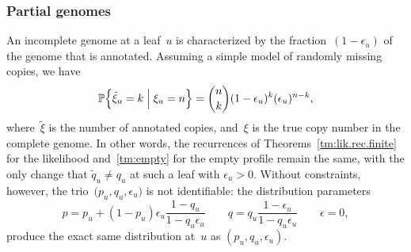 \documentclass{elsarticle}
\newcommand{\condgen}[6]{{#1}#2 #5 #3 #6 #4}
\newcommand{\PROB}{\mathbb{P}}
\newcommand{\Probcmd}[2]{\condgen{\PROB}{\Bigl\{}{\Bigm|}{\Bigr\}}{#1}{#2}}
\newcommand{\nx}{u}
\begin{document}
\subsubsection*{Partial genomes}
An incomplete genome at a leaf~$\nx$ is 
characterized by the fraction~$(1-\epsilon_{\nx})$ of the genome that is annotated. 
Assuming a simple model of randomly missing copies, we have 
\[
\Probcmd{\tilde{\xi}_{\nx}=k}{\xi_{\nx}=n} = \binom{n}{k} (1-\epsilon_{\nx})^k (\epsilon_{\nx})^{n-k},
\]
where~$\tilde{\xi}$ is the number of annotated copies, and~$\xi$ is the 
true copy number in the complete genome. In other words, the recurrences of 
Theorems~\ref{tm:lik.rec.finite} for the likelihood and~\ref{tm:empty} for the empty profile 
remain the same, with the only change that 
$\tilde{q}_{\nx}\ne q_{\nx}$ at such a leaf with $\epsilon_{\nx}>0$. 
Without constraints, however, the trio~$\bigl(p_{\nx},q_{\nx},\epsilon_{\nx}\bigr)$
is not identifiable: the distribution parameters 
\[
p = p_{\nx}+(1-p_{\nx})\epsilon_{\nx}\frac{1-q_{\nx}}{1-q_{\nx}\epsilon_{\nx}}
\qquad
q = q_{\nx}\frac{1-\epsilon_{\nx}}{1-q_{\nx}\epsilon_{\nx}}
\qquad
\epsilon = 0,
\]
produce the exact same distribution at~$\nx$ as $(p_{\nx},q_{\nx},\epsilon_{\nx})$. 

\end{document}
